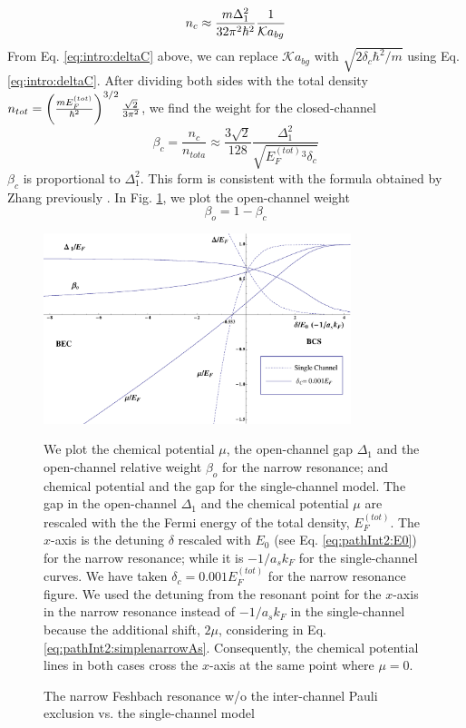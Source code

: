 \begin{equation}
{n_{c}}\approx\frac{m\Delta_{1}^{2}}{32\pi^{2}\hbar^{2}}\frac{1}{\mathcal{K}a_{bg}}
\end{equation}
From Eq. \ref{eq:intro:deltaC} above, we can replace $\mathcal{K}a_{bg}$ with $\sqrt{2\delta_{c}\hbar^{2}/m}$ using Eq. \ref{eq:intro:deltaC}. After  dividing both sides with the total density $n_{tot}=\left(\frac{mE_{F}^{(tot)}}{\hbar^{2}}\right)^{3/2}\frac{\sqrt{2}}{3\pi^{2}}$, we find the weight for the closed-channel
\begin{equation}
\beta_{c}=\frac{n_{c}}{n_{tota}}\approx\frac{3\sqrt2}{128}\frac{\Delta_{1}^{2}}{\sqrt{{E_{F}^{(tot)}}{}^{3}\delta_{c}}}
\end{equation}
 $\beta_{c}$ is proportional to $\Delta_{1}^{2}$.  This form is consistent with the formula obtained by Zhang previously \cite{shizhongUniv}.   In Fig. \ref{fig:pathInt2:narrow}, we plot the open-channel weight 
 \begin{equation}
 \beta_{o}=1-\beta_{c}
 \end{equation}

\begin{figure}[htbp]
\begin{center}
\includegraphics[width=0.8\textwidth]{narrow}
\caption{ The narrow Feshbach resonance w/o the inter-channel Pauli exclusion  vs.  the single-channel model} 
\label{fig:pathInt2:narrow}
\parbox{0.8\textwidth}{\small We plot the chemical potential $\mu$, the open-channel gap $\Delta_{1}$ and the open-channel relative weight $\beta_{o}$  for the narrow resonance; and chemical potential and the gap for the single-channel model.     The gap in the open-channel $\Delta_{1}$ and the chemical potential $\mu$ are rescaled with the the Fermi energy of the total density, $E_{F}^{(tot)}$.  The $x$-axis is the detuning $\delta$ rescaled with $E_{0}$ (see Eq. \ref{eq:pathInt2:E0}) for the narrow resonance; while it is $-1/a_{s}k_{F}$ for the single-channel curves. We have taken $\delta_{c}=0.001E_{F}^{(tot)}$ for the narrow resonance figure. We used the detuning from the resonant point  for the $x$-axis in the narrow resonance instead of $-1/a_{s}k_{F}$ in the single-channel because the additional shift, $2\mu$, considering in Eq. \ref{eq:pathInt2:simplenarrowAs}.  Consequently, the chemical potential lines in both cases cross the $x$-axis at the same point where $\mu=0$.  }
\end{center}
\end{figure}


